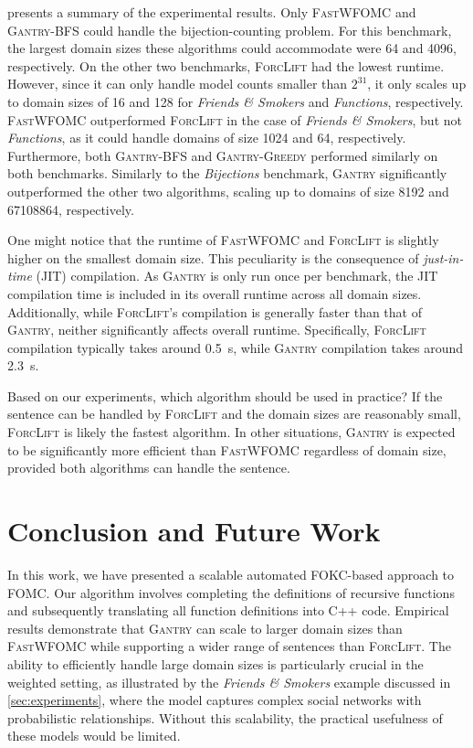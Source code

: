 \documentclass[a4paper,UKenglish,cleveref, autoref, thm-restate]{lipics-v2021}
\newcommand{\Cranetwo}{\textsc{Gantry}}
\newcommand{\Cranebfs}{\textsc{Gantry-BFS}}
\newcommand{\Cranegreedy}{\textsc{Gantry-Greedy}}
\newcommand{\friends}{\emph{Friends \& Smokers}}
\newcommand{\functions}{\emph{Functions}}
\newcommand{\bijections}{\emph{Bijections}}
\begin{document}
 presents a summary of the experimental results. Only
\textsc{FastWFOMC} and \Cranebfs{} could handle the bijection-counting problem.
For this benchmark, the largest domain sizes these algorithms could accommodate
were \num{64} and \num{4096}, respectively. On the other two benchmarks,
\textsc{ForcLift} had the lowest runtime. However, since it can only handle
model counts smaller than $2^{31}$, it only scales up to domain sizes of
\num{16} and \num{128} for \friends{} and \functions{}, respectively.
\textsc{FastWFOMC} outperformed \textsc{ForcLift} in the case of \friends{}, but
not \functions{}, as it could handle domains of size \num{1024} and \num{64},
respectively. Furthermore, both \Cranebfs{} and \Cranegreedy{} performed
similarly on both benchmarks. Similarly to the \bijections{} benchmark,
\Cranetwo{} significantly outperformed the other two algorithms, scaling up to
domains of size \num{8192} and \num{67108864}, respectively.

One might notice that the runtime of \textsc{FastWFOMC} and \textsc{ForcLift} is
slightly higher on the smallest domain size. This peculiarity is the consequence
of \emph{just-in-time} (JIT) compilation. As \Cranetwo{} is only run once per
benchmark, the JIT compilation time is included in its overall runtime across
all domain sizes. Additionally, while \textsc{ForcLift}'s compilation is
generally faster than that of \Cranetwo{}, neither significantly affects overall
runtime. Specifically, \textsc{ForcLift} compilation typically takes around
\SI{0.5}{\second}, while \Cranetwo{} compilation takes around \SI{2.3}{\second}.

Based on our experiments, which algorithm should be used in practice? If the
sentence can be handled by \textsc{ForcLift} and the domain sizes are reasonably
small, \textsc{ForcLift} is likely the fastest algorithm. In other situations,
\Cranetwo{} is expected to be significantly more efficient than
\textsc{FastWFOMC} regardless of domain size, provided both algorithms can
handle the sentence.

\section{Conclusion and Future Work}\label{sec:conclusion}

In this work, we have presented a scalable automated FOKC-based approach to
FOMC\@. Our algorithm involves completing the definitions of recursive functions
and subsequently translating all function definitions into C++ code. Empirical
results demonstrate that \Cranetwo{} can scale to larger domain sizes than
\textsc{FastWFOMC} while supporting a wider range of sentences than
\textsc{ForcLift}. The ability to efficiently handle large domain sizes is
particularly crucial in the weighted setting, as illustrated by the \friends{}
example discussed in \cref{sec:experiments}, where the model captures complex
social networks with probabilistic relationships. Without this scalability, the
practical usefulness of these models would be limited.
\end{document}
